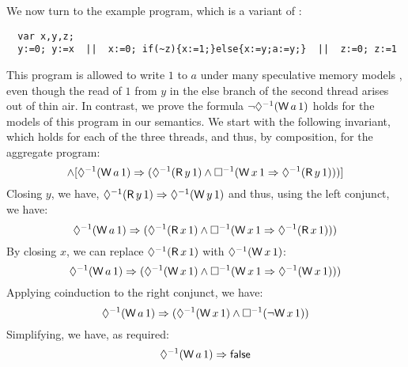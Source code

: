 We now turn to the example program, which is a variant of \cite[Figure 8]{DBLP:journals/toplas/Lochbihler13}:
\begin{verbatim}
  var x,y,z;
  y:=0; y:=x  ||  x:=0; if(~z){x:=1;}else{x:=y;a:=y;}  ||  z:=0; z:=1
\end{verbatim}
This program is allowed to write $1$ to $a$ under many speculative
memory models
\cite{Manson:2005:JMM:1047659.1040336,DBLP:conf/esop/JagadeesanPR10,DBLP:conf/popl/KangHLVD17},
even though the read of $1$ from $y$ in the else branch of the second
thread arises out of thin air.   In contrast, we prove the formula
\begin{math}
  \lnot\once(\DW{a}{1})
\end{math}
holds for the models of this program in our semantics.  We start with the following invariant,
which holds for each of the three threads, and thus, by composition, for the
aggregate program:
\begin{displaymath}
  [\once(\DW{y}{1}) \Rightarrow \once(\DR{x}{1})]
  \land
  [\once(\DW{a}{1}) \Rightarrow (\once(\DR{y}{1}) \land \always(\DW{x}{1} \Rightarrow \once(\DR{y}{1})))]
\end{displaymath}
Closing $y$, we have,
\begin{math}
  \once(\DR{y}{1}) \Rightarrow \once(\DW{y}{1}) %
\end{math}
and thus, using the left conjunct, we have:
\begin{displaymath}
  \once(\DW{a}{1}) \Rightarrow (\once(\DR{x}{1}) \land \always(\DW{x}{1} \Rightarrow \once(\DR{x}{1})))
\end{displaymath}
By closing $x$, we can replace $\once(\DR{x}{1})$ with $\once(\DW{x}{1})$:
\begin{displaymath}
  \once(\DW{a}{1}) \Rightarrow (\once(\DW{x}{1}) \land \always(\DW{x}{1} \Rightarrow \once(\DW{x}{1})))
\end{displaymath}
Applying coinduction to the right conjunct, we have:
\begin{displaymath}
  \once(\DW{a}{1}) \Rightarrow (\once(\DW{x}{1}) \land \always(\lnot \DW{x}{1}))
\end{displaymath}
Simplifying, we have, as required:  
\begin{displaymath}
  \once(\DW{a}{1}) \Rightarrow \FALSE
\end{displaymath}

